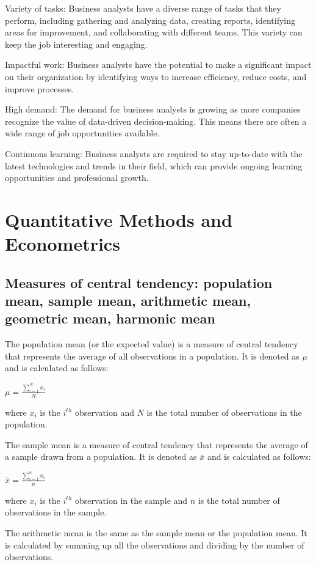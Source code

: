 \documentclass[12pt, a4paper, oneside]{article}
\begin{document}
Variety of tasks: Business analysts have a diverse range of tasks that they perform, including gathering and analyzing data, creating reports, identifying areas for improvement, and collaborating with different teams. This variety can keep the job interesting and engaging.

Impactful work: Business analysts have the potential to make a significant impact on their organization by identifying ways to increase efficiency, reduce costs, and improve processes.

High demand: The demand for business analysts is growing as more companies recognize the value of data-driven decision-making. This means there are often a wide range of job opportunities available.

Continuous learning: Business analysts are required to stay up-to-date with the latest technologies and trends in their field, which can provide ongoing learning opportunities and professional growth.

\section{Quantitative Methods and Econometrics}
\subsection{ Measures of central tendency: population mean, sample mean, arithmetic mean, geometric mean, harmonic mean }
The population mean (or the expected value) is a measure of central tendency that represents the average of all observations in a population. It is denoted as $\mu$ and is calculated as follows:

$\mu = \frac{\sum_{i=1}^{N}x_i}{N}$

where $x_i$ is the $i^{th}$ observation and $N$ is the total number of observations in the population.

The sample mean is a measure of central tendency that represents the average of a sample drawn from a population. It is denoted as $\bar{x}$ and is calculated as follows:

$\bar{x} = \frac{\sum_{i=1}^{n}x_i}{n}$

where $x_i$ is the $i^{th}$ observation in the sample and $n$ is the total number of observations in the sample.

The arithmetic mean is the same as the sample mean or the population mean. It is calculated by summing up all the observations and dividing by the number of observations.
\end{document}
